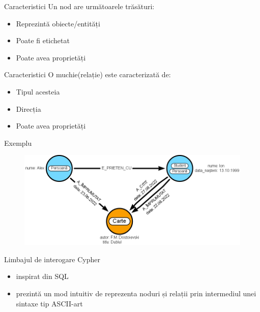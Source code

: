 \documentclass{beamer}
\begin{document}
\begin{frame}{Caracteristici}
    Un nod are următoarele trăsături:
    
    \begin{itemize}
        \item Reprezintă obiecte/entități
        \item Poate fi etichetat
        \item Poate avea proprietăți
    \end{itemize}
    
    
\end{frame}

\begin{frame}{Caracteristici}
    O muchie(relație) este caracterizată de:
    
    \begin{itemize}
        \item Tipul acesteia
        \item Direcția
        \item Poate avea proprietăți
    \end{itemize}
\end{frame}

\begin{frame}[fragile]{Exemplu}
    \begin{figure}[H]
        \centering
        \begin{adjustbox}{max size={\textwidth}{\textheight}}
        \includegraphics[scale = 0.4]{exemplu_1}
        \end{adjustbox}
    \end{figure}
\end{frame}

\begin{frame}{Limbajul de interogare Cypher}
    \begin{itemize}
        \item inspirat din SQL
        \item prezintă un mod intuitiv de reprezenta noduri și relații prin intermediul unei sintaxe tip ASCII-art
    \end{itemize}
\end{frame}
\end{document}
